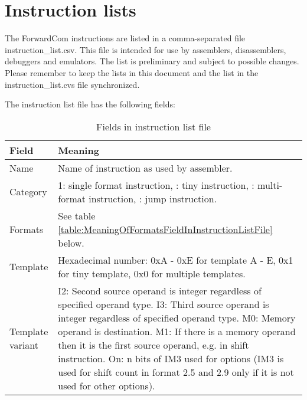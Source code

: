 \documentclass[forwardcom.tex]{subfiles}
\begin{document}
\RaggedRight

\chapter{Instruction lists}
The ForwardCom instructions are listed in a comma-separated file instruction\_list.csv. This file is intended for use by assemblers, disassemblers, debuggers and emulators. The list is preliminary and subject to possible changes. Please remember to keep the lists in this document and the list in the instruction\_list.cvs file synchronized.
\vspace{2mm}

The instruction list file has the following fields:

\begin{longtable} {|p{18mm}|p{100mm}|}
\caption{Fields in instruction list file} 
\label{table:fieldsInInstructionListFile}
\\
\endfirsthead
\endhead
\hline
\bfseries Field & \bfseries Meaning  \\
\hline
Name & Name of instruction as used by assembler.  \\
\hline
Category & 1: single format instruction, \newline
           2: tiny instruction,  \newline
           3: multi-format instruction,  \newline
           4: jump instruction. \\
\hline
Formats & See table \ref{table:MeaningOfFormatsFieldInInstructionListFile} below.  \\
\hline
Template & Hexadecimal number:  \newline
           0xA - 0xE for template A - E,  \newline
           0x1 for tiny template,  \newline
           0x0 for multiple templates. \\
\hline
Template variant & 
I2:  Second source operand is integer regardless of specified operand type.\newline
I3:  Third source operand is integer regardless of specified operand type.\newline
M0:  Memory operand is destination.\newline
M1:  If there is a memory operand then it is the first source operand, e.g. in shift instruction.\newline
On: n bits of IM3 used for options (IM3 is used for shift count in format 2.5 and 2.9 only if it is not used for other options).\newline

\end{longtable}
\end{document}
